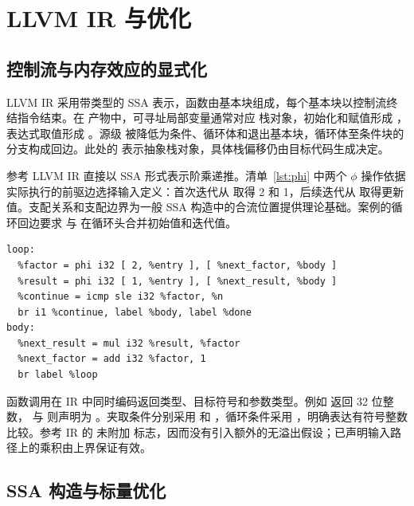\section{LLVM IR 与优化}
\label{sec:ir}

\subsection{控制流与内存效应的显式化}

LLVM IR 采用带类型的 SSA 表示，函数由基本块组成，每个基本块以控制流终结指令结束\cite{llvm-langref-2026}。在  产物中，可寻址局部变量通常对应  栈对象，初始化和赋值形成 ，表达式取值形成 。源级  被降低为条件、循环体和退出基本块，循环体至条件块的分支构成回边。此处的  表示抽象栈对象，具体栈偏移仍由目标代码生成决定。

参考 LLVM IR 直接以 SSA 形式表示阶乘递推。清单~\ref{lst:phi} 中两个 $\phi$ 操作依据实际执行的前驱边选择输入定义：首次迭代从  取得 2 和 1，后续迭代从  取得更新值。支配关系和支配边界为一般 SSA 构造中的合流位置提供理论基础\cite{cytron-et-al-ssa-1991}。案例的循环回边要求  与  在循环头合并初始值和迭代值。

\begin{center}
\begin{minipage}{0.92\linewidth}
\begin{lstlisting}[caption={阶乘循环在参考 LLVM IR 中的 SSA 表示。},label={lst:phi}]
loop:
  %factor = phi i32 [ 2, %entry ], [ %next_factor, %body ]
  %result = phi i32 [ 1, %entry ], [ %next_result, %body ]
  %continue = icmp sle i32 %factor, %n
  br i1 %continue, label %body, label %done
body:
  %next_result = mul i32 %result, %factor
  %next_factor = add i32 %factor, 1
  br label %loop
\end{lstlisting}
\end{minipage}
\end{center}

函数调用在 IR 中同时编码返回类型、目标符号和参数类型。例如  返回 32 位整数， 与  则声明为 。夹取条件分别采用  和 ，循环条件采用 ，明确表达有符号整数比较。参考 IR 的  未附加  标志，因而没有引入额外的无溢出假设；已声明输入路径上的乘积由上界保证有效。

\subsection{SSA 构造与标量优化}

